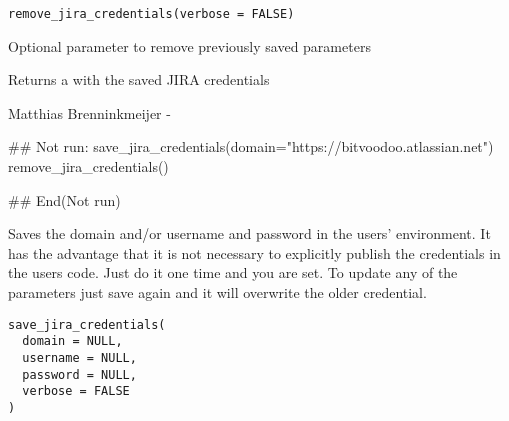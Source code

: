 \documentclass[a4paper]{book}
\begin{document}
%
\begin{Usage}
\begin{verbatim}
remove_jira_credentials(verbose = FALSE)
\end{verbatim}
\end{Usage}
%
\begin{Arguments}
\begin{ldescription}
\item[\code{verbose}] Optional parameter to remove previously saved parameters
\end{ldescription}
\end{Arguments}
%
\begin{Value}
Returns a  with the saved JIRA credentials
\end{Value}
%
\begin{Author}\relax
Matthias Brenninkmeijer - 
\end{Author}
%
\begin{Examples}
\begin{ExampleCode}
## Not run: 
save_jira_credentials(domain="https://bitvoodoo.atlassian.net")
remove_jira_credentials()

## End(Not run)
\end{ExampleCode}
\end{Examples}
%
\begin{Description}\relax
Saves the domain and/or username and password in the users' environment. It has the advantage that it is not necessary to explicitly publish the credentials in the users code. Just do it one time and you are set. To update any of the parameters just save again and it will overwrite the older credential.
\end{Description}
%
\begin{Usage}
\begin{verbatim}
save_jira_credentials(
  domain = NULL,
  username = NULL,
  password = NULL,
  verbose = FALSE
)
\end{verbatim}
\end{Usage}
%
\end{document}
